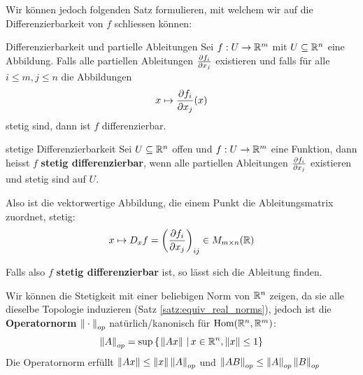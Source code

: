 Wir können jedoch folgenden Satz formulieren, mit welchem wir auf die Differenzierbarkeit von $f$ schliessen können:
\begin{satz}{Differenzierbarkeit und partielle Ableitungen}{}
Sei $f: U \to \mathbb{R}^m$ mit $U \subseteq \mathbb{R}^n$ eine Abbildung. Falls alle partiellen Ableitungen $\diffp{f_i}{x_j}$ existieren und falls für alle $i\leq m, j \leq n$ die Abbildungen
$$x \mapsto \diffp{f_i}{x_j}(x)$$
stetig sind, dann ist $f$ differenzierbar.
\end{satz}
\begin{definition}{stetige Differenzierbarkeit}{}
Sei $U \subseteq\mathbb{R}^n$ offen und $f:U \to \mathbb{R}^m$ eine Funktion, dann heisst $f$ \textbf{stetig differenzierbar}, wenn alle partiellen Ableitungen $\diffp{f_i}{x_j}$ existieren und stetig sind auf $U$.

Also ist die vektorwertige Abbildung, die einem Punkt die Ableitungsmatrix zuordnet, stetig:
$$x \mapsto D_xf = \bk{\diffp{f_i}{x_j}}_{ij} \in M_{m \times n}(\R)$$
\end{definition}
Falls also $f$ \textbf{stetig differenzierbar} ist, so lässt sich die Ableitung finden.
\begin{remark}
Wir können die Stetigkeit mit einer beliebigen Norm von $\mathbb{R}^n$ zeigen, da sie alle dieselbe Topologie induzieren (Satz \ref{satz:equiv_real_norms}), jedoch ist die \textbf{Operatornorm} $\left\|\:\cdot\:\right\|_{op}$ natürlich/kanonisch für $\text{Hom}(\mathbb{R}^n, \mathbb{R}^m)$:
$$\left\|A\right\|_{op} = \sup \left\{\left.\left\|Ax\right\| \ \right| x \in \mathbb{R}^n, \left\|x\right\| \leq 1 \right\}$$
Die Operatornorm erfüllt $\left\|Ax\right\| \leq \left\|x\right\| \left\|A\right\|_{op}$ und $\left\|AB\right\|_{op} \leq \left\|A\right\|_{op} \left\|B\right\|_{op}$
\end{remark}

